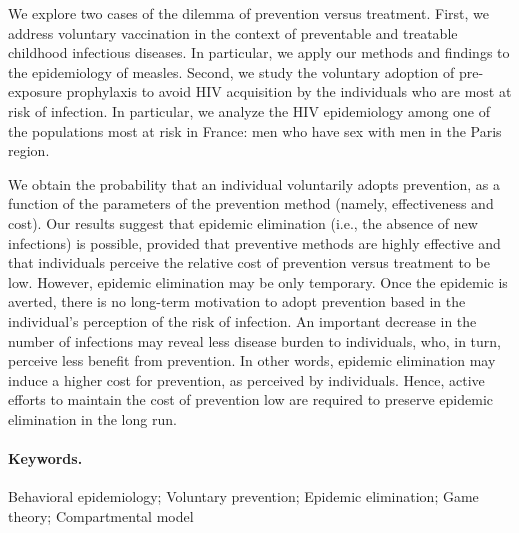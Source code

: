 We explore two cases of the dilemma of prevention versus treatment. First, we address voluntary vaccination in the context of preventable and treatable childhood infectious diseases. In particular, we apply our methods and findings to the epidemiology of measles. 
Second, we study the voluntary adoption of pre-exposure prophylaxis to avoid HIV acquisition by the individuals who are most at risk of infection. In particular, we analyze the HIV epidemiology among one of the populations most at risk in France: men who have sex with men in the Paris region.



We obtain the probability that an individual voluntarily adopts prevention, as a function of the parameters of the prevention method (namely, effectiveness and cost). Our results suggest that epidemic elimination (i.e., the absence of new infections) is possible, provided that preventive methods are highly effective and that individuals perceive the relative cost of prevention versus treatment to be low.
%
However, epidemic elimination may be only temporary. Once the epidemic is averted, there is no long-term motivation to adopt prevention based in the individual's perception of the risk of infection. An important decrease in the number of infections may reveal  less disease burden to individuals, who, in turn, perceive less benefit from prevention. In other words, epidemic elimination may induce a higher cost for prevention, as perceived by individuals. Hence, active efforts to maintain the cost of prevention low are required to preserve epidemic elimination in the long run.\\

\paragraph{Keywords.} Behavioral epidemiology; Voluntary prevention; Epidemic elimination; Game theory; Compartmental model
